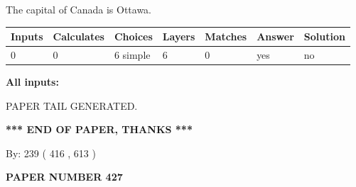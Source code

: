 \documentclass[12pt]{article}
\begin{document}
 
The capital of Canada is Ottawa.
 
 
\noindent{}
 
 
   
   
   
   
\noindent\begin{tabular}{|l|l|l|l|l|l|l|}
 \hline
Inputs & Calculates & Choices & Layers & Matches & Answer & Solution \\ \hline
 0  & 
 0  & 
 6
  simple  
  & 
 6  & 
 0  & 
  yes & 
  no 
  \\ \hline
 \end{tabular}
   
   
   
   
\noindent{}
   
   
   
   
\noindent\vspace{0.1in}\hspace{-0.08in} {\textbf{\Large{All inputs: }}}
   
   
   
   
   
   
 \vspace{0.2in}
 
   
   
\vspace{2.0in} PAPER TAIL GENERATED.
   
   
   
   
\vspace{1.0in} 
{\textbf{\large{ *** END OF PAPER, THANKS *** }}} 
   
   
\hspace{1.0in} By: 
 239 ( 416 ,  613 )
   
   
   
   
\newpage 
\setcounter{page}{ 
   427001 } 
   
   
   
   
 {\textbf{ \Large{ PAPER NUMBER  427  }}}
   
   
\vspace{0.2in}
   
   
   
   
   
   
   
\end{document}
